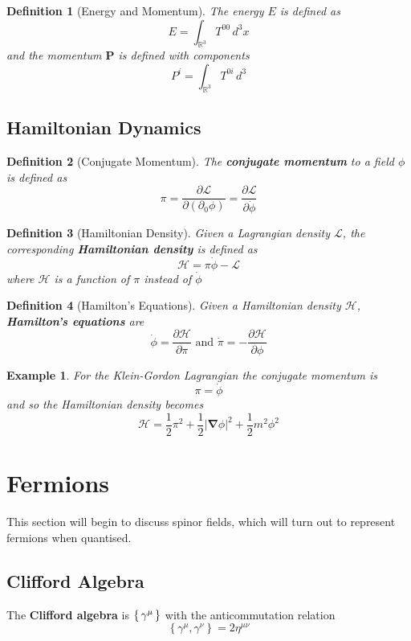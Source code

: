 \documentclass{article}
\newtheorem{definition}{Definition}[subsection]
\newtheorem{example}{Example}[subsection]
\newcommand{\grad}{\bm{\nabla}}
\newcommand{\del}{\partial}
\newcommand{\bam}[1]{\textbf{#1}}
\newcommand{\mbb}[1]{\mathbb{#1}}
\newcommand{\mc}[1]{\mathcal{#1}}
\newcommand{\acomm}[2][]{\left\{ #1, #2 \right\}} %
\newcommand{\pd}[2][]{\frac{\partial#1}{\partial#2}} %
\begin{document}
\begin{definition}[Energy and Momentum]
The energy $E$ is defined as 
\[
E=\int_{\mbb{R}^3} T^{00} \, d^3x
\]
and the momentum $\bm{P}$ is defined with components 
\[
P^i = \int_{\mbb{R}^3} T^{0i} \, d^3
\]

\end{definition}

\subsection{Hamiltonian Dynamics}

\begin{definition}[Conjugate Momentum]
The \bam{conjugate momentum} to a field $\phi$ is defined as 
\[
\pi = \pd[\mc{L}]{(\del_0\phi)} = \pd[\mc{L}]{\dot{\phi}}
\]
\end{definition}

\begin{definition}[Hamiltonian Density]
Given a Lagrangian density $\mc{L}$, the corresponding \bam{Hamiltonian density} is defined as 
\[
\mc{H}=\pi \dot{\phi}-\mc{L}
\]
where $\mc{H}$ is a function of $\pi$ instead of $\dot{\phi}$
\end{definition}

\begin{definition}[Hamilton's Equations]
Given a Hamiltonian density $\mc{H}$, \bam{Hamilton's equations} are 
\[
\dot{\phi}=\pd[\mc{H}]{\pi} \text{ and } \dot{\pi}=-\pd[\mc{H}]{\phi} 
\]
\end{definition}

\begin{example}
For the Klein-Gordon Lagrangian the conjugate momentum is 
\[
\pi=\dot{\phi}
\]
and so the Hamiltonian density becomes 
\[
\mc{H}=\frac{1}{2}\pi^2+\frac{1}{2}|\grad\phi|^2+\frac{1}{2}m^2\phi^2
\]
\end{example}

\section{Fermions}
This section will begin to discuss spinor fields, which will turn out to represent fermions when quantised.
\subsection{Clifford Algebra}
The \bam{Clifford algebra} is $\set{ \gamma^\mu }$ with the anticommutation relation 
\[
\acomm[\gamma^\mu]{\gamma^\nu} = 2\eta^{\mu\nu}
\]
\end{document}

